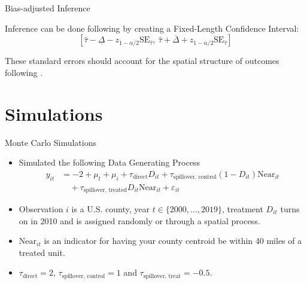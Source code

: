 \documentclass[aspectratio=43]{beamer}
\begin{document}
\begin{frame}{Bias-adjusted Inference}

    Inference can be done following \citet{Rambachan_Roth_2020} by creating a Fixed-Length Confidence Interval: 
    \[ 
        \left[
            \hat{\tau} - \underline{\Delta} - z_{1 - \alpha/2} \text{SE}_{\hat{\tau}}, \ \hat{\tau} + \overline{\Delta} + z_{1 - \alpha/2} \text{SE}_{\hat{\tau}}
        \right]
    \]

    These standard errors should account for the spatial structure of outcomes following \citet{Conley_1999}.
\end{frame}




\section{Simulations}


\begin{frame}{Monte Carlo Simulations}
    \begin{itemize}
        \item Simulated the following Data Generating Process \begin{align*}
            y_{it} &= -2 + \mu_t + \mu_i + \tau_{\text{direct}} D_{it} + \tau_{\text{spillover, control}} (1-D_{it}) \text{Near}_{it} \\ 
            &\quad + \tau_{\text{spillover, treated}} D_{it} \text{Near}_{it} + \varepsilon_{it}
        \end{align*}

        \item Observation $i$ is a U.S. county, year $t \in \{2000, \dots, 2019\}$, treatment $D_{it}$ turns on in 2010 and is assigned randomly or through a spatial process.
        
        \item $\text{Near}_{it}$ is an indicator for having your county centroid be within 40 miles of a treated unit. 
        
        \item $\tau_{\text{direct}} = 2$, $\tau_{\text{spillover, control}} = 1$ and $\tau_{\text{spillover, treat}} = -0.5$.
    \end{itemize}
\end{frame}
\end{document}
